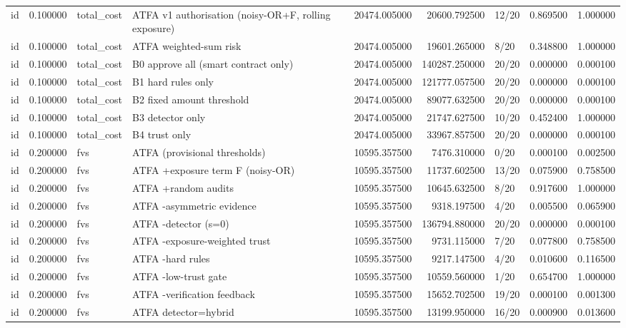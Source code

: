 \begin{tabular}{lrllrrlrr}
id & 0.100000 & total\_cost & ATFA v1 authorisation (noisy-OR+F, rolling exposure) & 20474.005000 & 20600.792500 & 12/20 & 0.869500 & 1.000000 \\
id & 0.100000 & total\_cost & ATFA weighted-sum risk & 20474.005000 & 19601.265000 & 8/20 & 0.348800 & 1.000000 \\
id & 0.100000 & total\_cost & B0 approve all (smart contract only) & 20474.005000 & 140287.250000 & 20/20 & 0.000000 & 0.000100 \\
id & 0.100000 & total\_cost & B1 hard rules only & 20474.005000 & 121777.057500 & 20/20 & 0.000000 & 0.000100 \\
id & 0.100000 & total\_cost & B2 fixed amount threshold & 20474.005000 & 89077.632500 & 20/20 & 0.000000 & 0.000100 \\
id & 0.100000 & total\_cost & B3 detector only & 20474.005000 & 21747.627500 & 10/20 & 0.452400 & 1.000000 \\
id & 0.100000 & total\_cost & B4 trust only & 20474.005000 & 33967.857500 & 20/20 & 0.000000 & 0.000100 \\
id & 0.200000 & fvs & ATFA (provisional thresholds) & 10595.357500 & 7476.310000 & 0/20 & 0.000100 & 0.002500 \\
id & 0.200000 & fvs & ATFA +exposure term F (noisy-OR) & 10595.357500 & 11737.602500 & 13/20 & 0.075900 & 0.758500 \\
id & 0.200000 & fvs & ATFA +random audits & 10595.357500 & 10645.632500 & 8/20 & 0.917600 & 1.000000 \\
id & 0.200000 & fvs & ATFA -asymmetric evidence & 10595.357500 & 9318.197500 & 4/20 & 0.005500 & 0.065900 \\
id & 0.200000 & fvs & ATFA -detector (s=0) & 10595.357500 & 136794.880000 & 20/20 & 0.000000 & 0.000100 \\
id & 0.200000 & fvs & ATFA -exposure-weighted trust & 10595.357500 & 9731.115000 & 7/20 & 0.077800 & 0.758500 \\
id & 0.200000 & fvs & ATFA -hard rules & 10595.357500 & 9217.147500 & 4/20 & 0.010600 & 0.116500 \\
id & 0.200000 & fvs & ATFA -low-trust gate & 10595.357500 & 10559.560000 & 1/20 & 0.654700 & 1.000000 \\
id & 0.200000 & fvs & ATFA -verification feedback & 10595.357500 & 15652.702500 & 19/20 & 0.000100 & 0.001300 \\
id & 0.200000 & fvs & ATFA detector=hybrid & 10595.357500 & 13199.950000 & 16/20 & 0.000900 & 0.013600 \\

\end{tabular}
